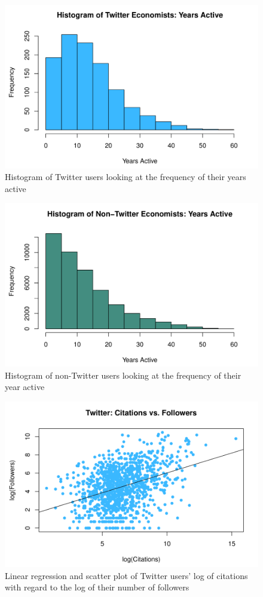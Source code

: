 \documentclass[12pt, Times New Roman]{article}
\begin{document}
\begin{figure}[h]
    \includegraphics[width=.75\textwidth]{Histogram-Twitter-yearsactive.png}
    \centering
    \caption{Histogram of Twitter users looking at the frequency of their years active}
    \label{Hist3}
\end{figure}

\begin{figure}[h]
    \includegraphics[width=.75\textwidth]{Histogram-NonTwitter-yearsactive.png}
    \centering
    \caption{Histogram of non-Twitter users looking at the frequency of their year active}
    \label{Hist4}
\end{figure}

\begin{figure}[h]
    \includegraphics[width=.75\textwidth]{Scatter-Followers.png}
    \centering
    \caption{Linear regression and scatter plot of Twitter users' log of citations with regard to the log of their number of followers}
    \label{Scat1}
\end{figure}
\end{document}
